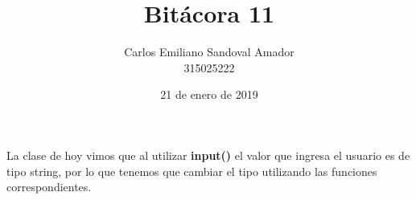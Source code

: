 \documentclass[letterpaper, 12pt, oneside]{article}%
\title{Bitácora 11}
\author{Carlos Emiliano Sandoval Amador \\ 315025222}
\date{21 de enero de 2019}
\begin{document}
	\maketitle
	La clase de hoy vimos que al utilizar \textbf{input()} el valor que ingresa el usuario es de tipo string, por lo que tenemos que cambiar el tipo utilizando las funciones correspondientes.
\end{document}
